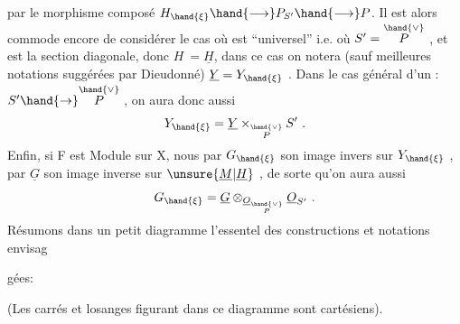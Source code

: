 
par le morphisme composé $H_{\hand{\xi}} \hand{\longrightarrow} P_{S'} \hand{\longrightarrow} P$. Il est alors commode
 encore de considérer le cas où \hand{$\xi$} est
``universel'' i.e. où $S' = \overset{\hand{\vee}}{P}$ , et \hand{$\xi$} est la section diagonale, donc $H \ = \underline{H}$,
dans ce cas on notera (sauf meilleures notations suggérées par Dieudonné)
$\underline{Y} = Y_{\hand{\xi}}$ . Dans le cas général d'un \hand{$\xi$}: $S' \hand{\to} \overset{\hand{\vee}}{P}$ , on aura donc aussi
\[ Y_{\hand{\xi}} = \underline{Y} \times_{\overset{\hand{\vee}}{P}} S' \ . \]
Enfin, si F est Module sur X, nous  par $G_{\hand{\xi}}$ son image invers
sur $Y_{\hand{\xi}}$ , par $\underline{G}$ son image inverse sur $\unsure{\underline{M}|\underline{H}}$ , de sorte qu'on aura aussi
\[ G_{\hand{\xi}} = \underline{G} \otimes_{\underline{O}_{\overset{\hand{\vee}}{P}}} \underline{O}_{S'} \ . \]
Résumons dans un petit diagramme l'essentel des constructions et notations envisag

gées:

(Les carrés et losanges figurant dans ce diagramme sont cartésiens).


